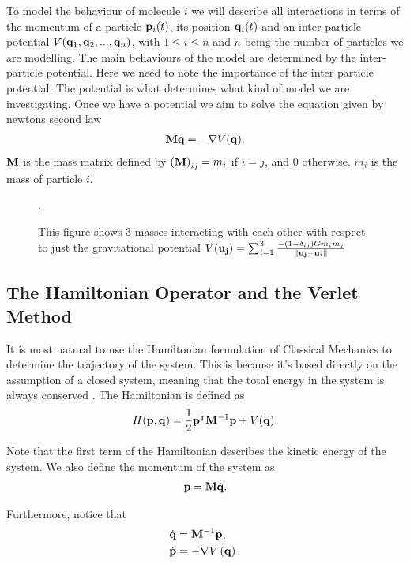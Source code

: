 To model the behaviour of molecule $i$ we will describe all interactions in terms of the momentum of a particle $\mathbf{p}_{i}(t)$, its position $\mathbf{q}_{i}(t)$ and an inter-particle potential $V(\mathbf{q}_1, \mathbf{q}_2,..., \mathbf{q}_n)$, with $1\leq i \leq n$ and $n$ being the number of particles we are modelling. The main behaviours of the model are determined by the inter-particle potential. Here we need to note the importance of the inter particle potential. The potential is what determines what kind of model we are investigating. Once we have  a potential we aim to solve the equation given by newtons second law
\begin{align}
\mathbf{M}\ddot{\mathbf{q}} = -\nabla V(\mathbf{q}).\label{eq:1}
\end{align}
$\mathbf{M}$ is the mass matrix defined by $\left(\mathbf{M}\right)_{ij}=m_i$ if $i=j$, and $0$ otherwise. $m_i$ is the mass of particle $i$.

\begin{figure}[h]
\centering
\def\svgscale{0.35}

\caption{This figure shows 3 masses interacting with each other with respect to just the gravitational potential $V(\mathbf{\mathbf{u}_j})=\sum_{i=1}^3\frac{-(1-\delta_{ij}) Gm_im_j}{\norm{\mathbf{\mathbf{u}_j}-\mathbf{u}_i}}$}.
\end{figure}


\subsection{The Hamiltonian Operator and the Verlet Method}
It is most natural to use the Hamiltonian formulation of Classical Mechanics to determine the trajectory of the system. This is because it's based directly on the assumption of a closed system, meaning that the total energy in the system is always conserved  \citep{BenLeimkuhler2015}. The Hamiltonian is defined as
\begin{align*}
H(\mathbf{p}, \mathbf{q}) = \frac{1}{2}\mathbf{p}^{\intercal}\mathbf{M}^{-1}\mathbf{p} +V(\mathbf{q}).
\end{align*}

 Note that the first term of the Hamiltonian describes the kinetic energy of the system. We also define the momentum of the system as  
 \begin{align*}
 \mathbf{p} = \mathbf{M}\dot{\mathbf{q}}.
 \end{align*} 
 
 Furthermore, notice that  
 \begin{align*}
 \dot{\mathbf{q}} &= \mathbf{M}^{-1}\mathbf{p}, \\
 \dot{\mathbf{p}} & = -\nabla V\left( \mathbf{q}\right).
 \end{align*}
 
